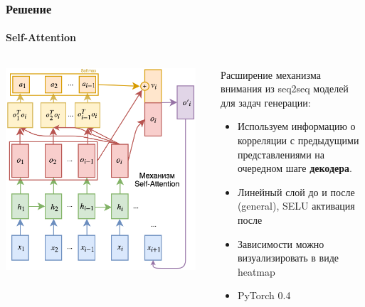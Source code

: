 \documentclass[10pt]{beamer}
\begin{document}
\begin{frame}
\end{frame}
\begin{frame}
\frametitle{Решение}
\framesubtitle{Self-Attention}


\begin{center}
    \begin{columns}
        \begin{column}{0.6\textwidth}
            \begin{center}
                \includegraphics[width=0.95\textwidth]{images/self_attention.png}
            \end{center}
        \end{column}
        \begin{column}{0.45\textwidth}
            Расширение механизма внимания из seq2seq моделей для задач генерации:
            \begin{itemize}
                \item Используем информацию о корреляции с предыдущими представлениями на очередном шаге \textbf{декодера}.
                \item Линейный слой до и после (general), SELU активация после
                \item Зависимости можно визуализировать в виде heatmap
                \item PyTorch 0.4
            \end{itemize}
        \end{column}
    \end{columns}
\end{center}

\end{frame}
\end{document}

